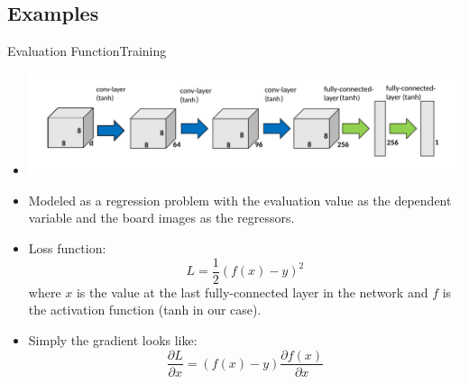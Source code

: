 \documentclass[9pt, unknownkeysallowed]{beamer}
\begin{document}
\subsection{Examples}
\begin{frame}{Evaluation Function}{Training}
\begin{itemize}
  \item[] \includegraphics[width=.90\textwidth,center]{../img/net3.png}
  \item Modeled as a regression problem with the evaluation value as the 
dependent variable and the board images as the regressors.
  \item Loss function: \[L = \frac{1}{2}(f(x)-y)^2\] where $x$ is the value at 
the last fully-connected layer in the network and $f$ is the activation 
function (tanh in our 
case).
\item Simply the gradient looks like:
\[\frac{\partial L}{\partial x} = (f(x)-y)\frac{\partial f(x)}{\partial x}\]
\end{itemize}
\end{frame}
\end{document}
